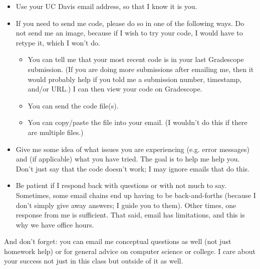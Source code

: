 \documentclass{article}
\begin{document}
\begin{itemize}[itemsep=0mm,parsep=0pt]
\item Use your UC Davis email address, so that I know it is you.
\item If you need to send me code, please do so in one of the following ways. Do not send me an image, because if I wish to try your code, I would have to retype it, which I won't do.
    \begin{itemize}[itemsep=0mm, parsep=0pt]
    \item You can tell me that your most recent code is in your last Gradescope submission. (If you are doing more submissions after emailing me, then it would probably help if you told me a submission number, timestamp, and/or URL.) I can then view your code on Gradescope.
    \item You can send the code file(s). 
    \item You can copy/paste the file into your email. (I wouldn't do this if there are multiple files.)
    \end{itemize}
\item Give me some idea of what issues you are experiencing (e.g. error messages) and (if applicable) what you have tried. The goal is to help me help you. Don't just say that the code doesn't work; I may ignore emails that do this.
\item Be patient if I respond back with questions or with not much to say. Sometimes, some email chains end up having to be back-and-forths (because I don't simply give away answers; I guide you to them). Other times, one response from me is sufficient. That said, email has limitations, and this is why we have office hours.
\end{itemize}

And don't forget: you can email me conceptual questions as well (not just homework help) or for general advice on computer science or college. I care about your success not just in this class but outside of it as well.
\end{document}
